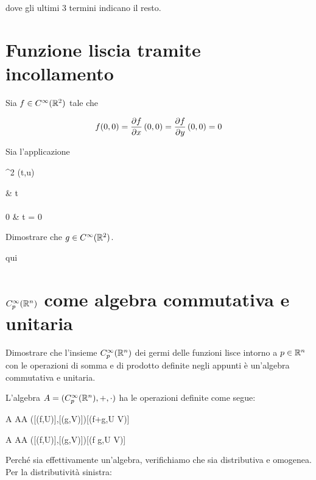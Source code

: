 dove gli ultimi 3 termini indicano il resto.

%

\newpage

%

\section{Funzione liscia tramite incollamento}\label{es1-6}

\begin{tcolorbox}
	Sia $ f \in C^{\infty} (\mathbb{R}^{2}) $ tale che
	
	\begin{equation}
		f(0,0) = \pdv{f}{x} \, (0,0) = \pdv{f}{y} \, (0,0) = 0
	\end{equation}
	
	Sia l'applicazione
	
		{\R^{2}}{\R}
		{(t,u)}{%
				\begin{cases}
					 & t \neq 0\\\\
					0 & t = 0
				\end{cases}
				}
	
	Dimostrare che $ g \in C^{\infty}(\mathbb{R}^{2}) $.
\end{tcolorbox}

qui

%

\newpage

%

\section{$ C_{p}^{\infty}(\mathbb{R}^{n}) $ come algebra commutativa e unitaria}\label{es1-7}

\begin{tcolorbox}
	Dimostrare che l'insieme $ C_{p}^{\infty}(\mathbb{R}^{n}) $ dei germi delle funzioni lisce intorno a $ p \in \mathbb{R}^{n} $ con le operazioni di somma e di prodotto definite negli appunti è un'algebra commutativa e unitaria.
\end{tcolorbox}

L'algebra $ A = (C_{p}^{\infty}(\mathbb{R}^{n}),+,\cdot) $ ha le operazioni definite come segue:

\map{+}
	{A \times A}{A}
	{([(f,U)],[(g,V)])}{[(f+g,U \cap V)]}

\map{\cdot}
	{A \times A}{A}
	{([(f,U)],[(g,V)])}{[(f g,U \cap V)]}

Perché sia effettivamente un'algebra, verifichiamo che sia distributiva e omogenea.\\
Per la distributività sinistra:

